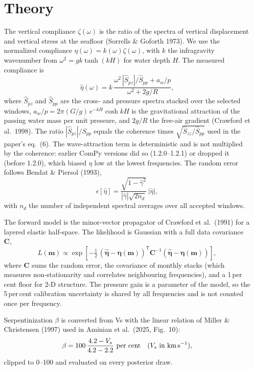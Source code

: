 \documentclass[10pt,a4paper,twocolumn]{article}
\begin{document}
\section{Theory}
The vertical compliance $\zeta(\omega)$ is the ratio of the spectra of vertical displacement and vertical
stress at the seafloor (Sorrells \& Goforth 1973). We use the normalized compliance $\eta(\omega) = k(\omega)\zeta(\omega)$,
with $k$ the infragravity wavenumber from $\omega^2 = gk\tanh(kH)$ for water depth $H$. The measured compliance is
\begin{equation}
\hat\eta(\omega) = k\,\frac{\omega^2\,|\hat S_{pz}|/\hat S_{pp} + a_w/p}{\omega^2 + 2g/R},
\end{equation}
where $\hat S_{pz}$ and $\hat S_{pp}$ are the cross- and pressure spectra stacked over the selected windows,
$a_w/p = 2\pi (G/g)\,e^{-kH}\cosh kH$ is the gravitational attraction of the passing water mass per unit pressure, and $2g/R$
the free-air gradient (Crawford et al.\ 1998). The ratio $|\hat S_{pz}|/\hat S_{pp}$ equals the coherence times
$\sqrt{\hat S_{zz}/\hat S_{pp}}$ used in the paper's eq.~(6). The wave-attraction term is deterministic and is not
multiplied by the coherence: earlier ComPy versions did so (1.2.0--1.2.1) or dropped it (before 1.2.0), which biased $\eta$
low at the lowest frequencies. The random error follows Bendat \& Piersol (1993),
\begin{equation}
\epsilon[\hat\eta] = \frac{\sqrt{1-\hat\gamma^2}}{|\hat\gamma|\sqrt{2n_d}}\,|\hat\eta|,
\end{equation}
with $n_d$ the number of independent spectral averages over all accepted windows.

The forward model is the minor-vector propagator of Crawford et al.\ (1991) for a layered elastic half-space.
The likelihood is Gaussian with a full data covariance $\mathbf{C}$,
\begin{equation}
L(\mathbf{m}) \propto \exp\!\left[-\tfrac12\,(\hat{\boldsymbol\eta} - \boldsymbol\eta(\mathbf{m}))^{\mathsf T}\mathbf{C}^{-1}(\hat{\boldsymbol\eta} - \boldsymbol\eta(\mathbf{m}))\right],
\end{equation}
where $\mathbf{C}$ sums the random error, the covariance of monthly stacks (which measures non-stationarity and
correlates neighbouring frequencies), and a 1\,per\,cent floor for 2-D structure. The pressure gain is a parameter
of the model, so the 5\,per\,cent calibration uncertainty is shared by all frequencies and is not counted once per frequency.

Serpentinization $\beta$ is converted from Vs with the linear relation of Miller \& Christensen (1997) used in
Aminian et al.\ (2025, Fig.~10):
\begin{equation}
\beta = 100\,\frac{4.2 - V_s}{4.2 - 2.2}\ \text{per cent}\quad (V_s \text{ in km\,s}^{-1}),
\end{equation}
clipped to 0--100 and evaluated on every posterior draw.
\end{document}
